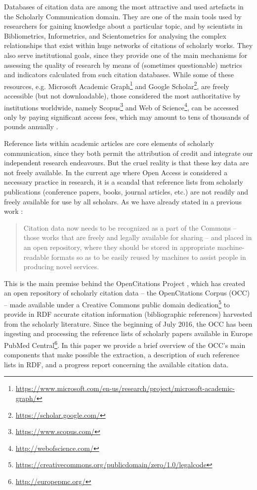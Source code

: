 \documentclass[runningheads,a4paper]{llncs}
\begin{document}
Databases of citation data are among the most attractive and used artefacts in the Scholarly Communication domain. They are one of the main tools used by researchers for gaining knowledge about a particular topic, and by scientists in Bibliometrics, Informetrics, and Scientometrics for analysing the complex relationships that exist within huge networks of citations of scholarly works. They also serve institutional goals, since they provide one of the main mechanisms for assessing the quality of research by means of (sometimes questionable) metrics and indicators calculated from such citation databases. While some of these resources, e.g. Microsoft Academic Graph\footnote{\url{https://www.microsoft.com/en-us/research/project/microsoft-academic-graph/}} and Google Scholar\footnote{\url{https://scholar.google.com/}}, are freely accessible (but not downloadable), those considered the most authoritative by institutions worldwide, namely Scopus\footnote{\url{https://www.scopus.com/}} and Web of Science\footnote{\url{http://webofscience.com/}}, can be accessed only by paying significant access fees, which may amount to tens of thousands of pounds annually  \cite{__RefNumPara__293_1852566440}.

Reference lists within academic articles are core elements of scholarly communication, since they both permit the attribution of credit and integrate our independent research endeavours. But the cruel reality is that these key data are not freely available. In the current age where Open Access is considered a necessary practice in research, it is a scandal that reference lists from scholarly publications (conference papers, books, journal articles, etc.) are not readily and freely available for use by all scholars. As we have already stated in a previous work  \cite{__RefNumPara__293_1852566440}: 

\begin{quote}
Citation data now needs to be recognized as a part of the Commons -- those works that are freely and legally available for sharing -- and placed in an open repository, where they should be stored in appropriate machine-readable formats so as to be easily reused by machines to assist people in producing novel services.
\end{quote}

This is the main premise behind the OpenCitations Project  \cite{__RefNumPara__293_1852566440} \cite{__RefNumPara__6041_1890349413}, which has created an open repository of scholarly citation data -- the OpenCitations Corpus (OCC) -- made available under a Creative Commons public domain dedication\footnote{\url{https://creativecommons.org/publicdomain/zero/1.0/legalcode}} to provide in RDF accurate citation information (bibliographic references) harvested from the scholarly literature. Since the beginning of July 2016, the OCC has been ingesting and processing the reference lists of scholarly papers available in Europe PubMed Central\footnote{\url{http://europepmc.org/}}. In this paper we provide a brief overview of the OCC's main components that make possible the extraction, a description of such reference lists in RDF, and a progress report concerning the available citation data.
\end{document}

